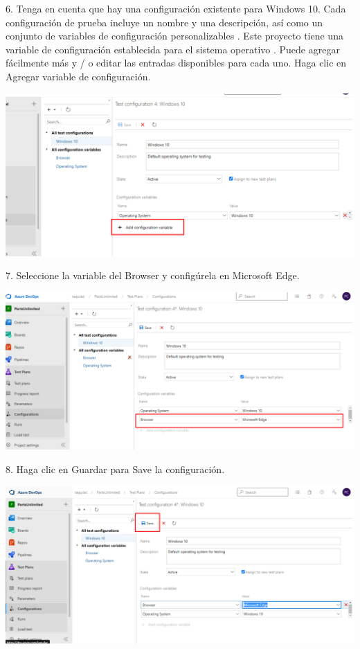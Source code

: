 \documentclass[12pt,letterpaper]{article}
\begin{document}
6. Tenga en cuenta que hay una configuración existente para Windows 10.  Cada configuración de prueba incluye un nombre y una descripción, así como un conjunto de variables de configuración personalizables . Este proyecto tiene una variable de configuración establecida para el sistema operativo . Puede agregar fácilmente más y / o editar las entradas disponibles para cada uno. Haga clic en Agregar variable de configuración.

\begin{center}
		\includegraphics[width=15cm]{./Imagenes/17} 
\end{center}

7. Seleccione la variable del Browser y configúrela en Microsoft Edge.

\begin{center}
		\includegraphics[width=15cm]{./Imagenes/18} 
\end{center}

8. Haga clic en Guardar para Save la configuración.

\begin{center}
		\includegraphics[width=15cm]{./Imagenes/19} 
\end{center}
\end{document}
